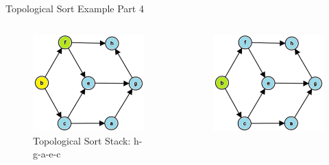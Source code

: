 \documentclass[aspectratio=169]{beamer}%
\begin{document}
\begin{frame}{Topological Sort Example Part 4}
    \begin{columns}
        \begin{column}{.32\textwidth}
            \begin{figure}
                \centering
                \includegraphics[width = .9\linewidth]{topsort10.png}
                \caption{Topological Sort Stack: h-g-a-e-c}
            \end{figure}
        \end{column}
        \hfill
        \begin{column}{.32\textwidth}
            \begin{figure}
                \centering
                \includegraphics[width = .9\linewidth]{topsort11.png}

\end{figure}
\end{column}
\end{columns}
\end{frame}
\end{document}
